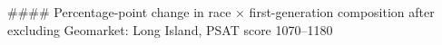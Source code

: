 #### Percentage-point change in race × first-generation composition after excluding Geomarket: Long Island, PSAT score 1070–1180
